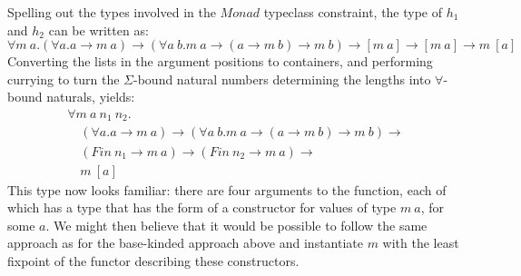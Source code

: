 \documentclass{llncs}
\begin{document}
Spelling out the types involved in the $\mathit{Monad}$ typeclass
constraint, the type of $h_1$ and $h_2$ can be written as:
\begin{displaymath}
  \forall m~a.
  (\forall a. a \to m~a) \to
  (\forall a~b. m~a \to (a \to m~b) \to m~b) \to
  [m~a] \to
  [m~a] \to
  m~[a]
\end{displaymath}
Converting the lists in the argument positions to containers, and
performing currying to turn the $\Sigma$-bound natural numbers
determining the lengths into $\forall$-bound naturals, yields:
\begin{displaymath}
  \begin{array}{l}
    \forall m~a~n_1~n_2. \\
    \quad (\forall a. a \to m~a) \to (\forall a~b. m~a \to (a \to m~b) \to m~b) \to \\
    \quad (\mathit{Fin}~n_1 \to m~a) \to (\mathit{Fin}~n_2 \to m~a) \to \\
    \quad m~[a]
  \end{array}
\end{displaymath}
This type now looks familiar: there are four arguments to the
function, each of which has a type that has the form of a constructor
for values of type $m~a$, for some $a$. We might then believe that it
would be possible to follow the same approach as for the base-kinded
approach above and instantiate $m$ with the least fixpoint of the
functor describing these constructors.
\end{document}
